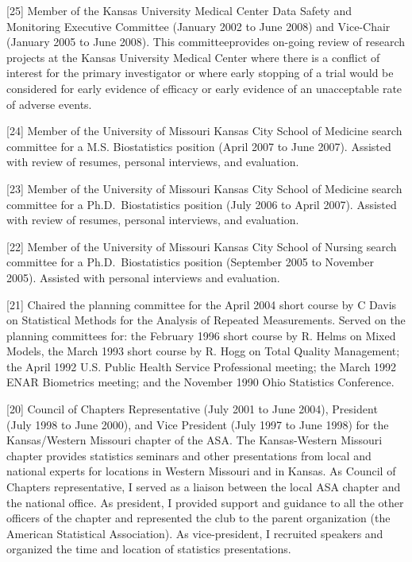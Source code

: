 \documentclass[
  12pt,
]{article}
\begin{document}
{[}25{]} Member of the Kansas University Medical Center Data Safety and
Monitoring Executive Committee (January 2002 to June 2008) and
Vice-Chair (January 2005 to June 2008). This committeeprovides on-going
review of research projects at the Kansas University Medical Center
where there is a conflict of interest for the primary investigator or
where early stopping of a trial would be considered for early evidence
of efficacy or early evidence of an unacceptable rate of adverse events.

{[}24{]} Member of the University of Missouri Kansas City School of
Medicine search committee for a M.S. Biostatistics position (April 2007
to June 2007). Assisted with review of resumes, personal interviews, and
evaluation.

{[}23{]} Member of the University of Missouri Kansas City School of
Medicine search committee for a Ph.D.~Biostatistics position (July 2006
to April 2007). Assisted with review of resumes, personal interviews,
and evaluation.

{[}22{]} Member of the University of Missouri Kansas City School of
Nursing search committee for a Ph.D.~Biostatistics position (September
2005 to November 2005). Assisted with personal interviews and
evaluation.

{[}21{]} Chaired the planning committee for the April 2004 short course
by C Davis on Statistical Methods for the Analysis of Repeated
Measurements. Served on the planning committees for: the February 1996
short course by R. Helms on Mixed Models, the March 1993 short course by
R. Hogg on Total Quality Management; the April 1992 U.S. Public Health
Service Professional meeting; the March 1992 ENAR Biometrics meeting;
and the November 1990 Ohio Statistics Conference.

{[}20{]} Council of Chapters Representative (July 2001 to June 2004),
President (July 1998 to June 2000), and Vice President (July 1997 to
June 1998) for the Kansas/Western Missouri chapter of the ASA. The
Kansas-Western Missouri chapter provides statistics seminars and other
presentations from local and national experts for locations in Western
Missouri and in Kansas. As Council of Chapters representative, I served
as a liaison between the local ASA chapter and the national office. As
president, I provided support and guidance to all the other officers of
the chapter and represented the club to the parent organization (the
American Statistical Association). As vice-president, I recruited
speakers and organized the time and location of statistics
presentations.
\end{document}
